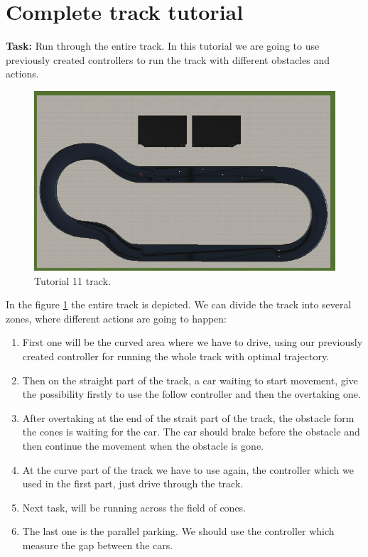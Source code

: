 \section{Complete track tutorial}
\textbf{Task:} Run through the entire track. \newline \newline
In this tutorial we are going to use previously created controllers to run the track with different obstacles and actions.
\begin{figure}[ht]
    \centering
    \includegraphics[width=\linewidth]{src/pic/track_tutorial11}
    \caption{Tutorial 11 track.}
    \label{fig:tutorial11-track}
\end{figure}
In the figure \ref{fig:tutorial11-track} the entire track is depicted. We can divide the track into several zones, where different actions are going to happen:
\begin{enumerate}
    \item First one will be the curved area where we have to drive, using our previously created controller for running the whole track with optimal trajectory.
    \item Then on the straight part of the track, a car waiting to start movement, give the possibility firstly to use the follow controller and then the overtaking one.
    \item After overtaking at the end of the strait part of the track, the obstacle form the cones is waiting for the car. The car should brake before the obstacle and then continue the movement when the obstacle is gone.
    \item At the curve part of the track we have to use again, the controller which we used in the first part, just drive through the track.
    \item Next task, will be running across the field of cones.
    \item The last one is the parallel parking. We should use the controller which measure the gap between the cars.
\end{enumerate}
